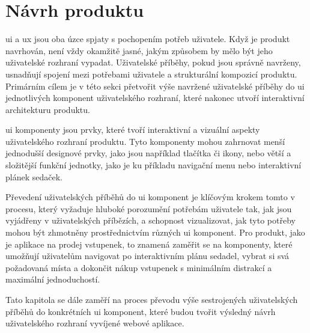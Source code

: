 \section{Návrh produktu}
\label{sec:navrh-ui-navrh-produktu}
\acl{ui} a \acl{ux} jsou oba úzce spjaty s pochopením potřeb uživatele.
Když je produkt navrhován, není vždy okamžitě jasné, jakým způsobem by mělo být jeho uživatelské rozhraní vypadat.
Uživatelské příběhy, pokud jsou správně navrženy, usnadňují spojení mezi potřebami uživatele a strukturální kompozicí produktu.
Primárním cílem je v této sekci přetvořit výše navržené uživatelské příběhy do \ac{ui} jednotlivých komponent uživatelského rozhraní, které nakonec utvoří interaktivní architekturu produktu.

\ac{ui} komponenty jsou prvky, které tvoří interaktivní a vizuální aspekty uživatelského rozhraní produktu.
Tyto komponenty mohou zahrnovat menší jednodušší designové prvky, jako jsou například tlačítka či ikony, nebo větší a složitější funkční jednotky, jako je ku příkladu navigační menu nebo interaktivní plánek sedaček.

Převedení uživatelských příběhů do \ac{ui} komponent je klíčovým krokem tomto v procesu, který vyžaduje hluboké porozumění potřebám uživatele tak, jak jsou vyjádřeny v uživatelských příbězích, a schopnost vizualizovat, jak tyto potřeby mohou být zhmotněny prostřednictvím různých \ac{ui} komponent.
Pro produkt, jako je aplikace na prodej vstupenek, to znamená zaměřit se na komponenty, které umožňují uživatelům navigovat po interaktivním plánu sedadel, vybrat si svá požadovaná místa a dokončit nákup vstupenek s minimálním distrakcí a maximální jednoduchostí.

Tato kapitola se dále zaměří na proces převodu výše sestrojených uživatelských příběhů do konkrétních \ac{ui} komponent, které budou tvořit výsledný návrh uživatelského rozhraní vyvíjené webové aplikace.

